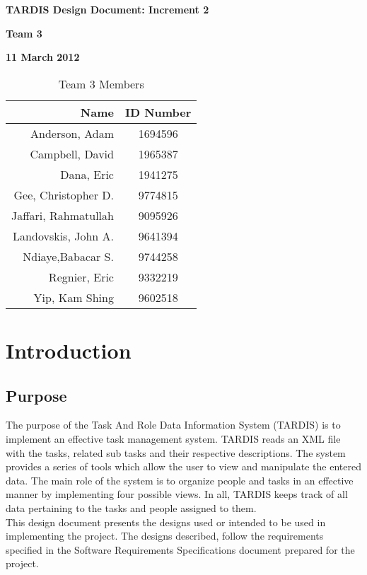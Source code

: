 \documentclass[12pt]{article}
\begin{document}
\vspace*{0.5in}
\centerline{\bf\Large TARDIS Design Document: Increment 2}

\vspace*{0.5in}
\centerline{\bf\Large Team 3}

\vspace*{0.5in}
\centerline{\bf\Large 11 March 2012}

\vspace*{1.5in}
\begin{table}[htbp]
\caption{Team 3 Members}
\begin{center}
\begin{tabular}{|r | c|}
\hline
Name & ID Number \\
\hline\hline
Anderson, Adam & 1694596\\
Campbell, David& 1965387\\
Dana, Eric & 1941275\\
Gee, Christopher D.& 9774815\\
Jaffari, Rahmatullah & 9095926\\
Landovskis, John A. & 9641394\\
Ndiaye,Babacar S. & 9744258\\
Regnier, Eric & 9332219\\
Yip, Kam Shing & 9602518\\
\hline
\end{tabular}
\end{center}
\end{table}

\clearpage

\section{Introduction}
\vspace*{0.1in}
\subsection{Purpose}

The purpose of the Task And Role Data Information System (TARDIS) is to implement an effective task management system.
 TARDIS reads an XML file with the tasks, related sub tasks and their respective descriptions. The system provides a series of tools
which allow the user to view and manipulate the entered data. The main role of the system is to organize people and tasks in 
an effective manner by implementing four possible views. In all, TARDIS keeps track of all data pertaining to the tasks and people assigned
to them.
\\[20px]This design document presents the designs used or intended to be used in implementing the project. The designs described, follow the requirements specified in the Software Requirements Specifications document prepared for the project.
\end{document}
